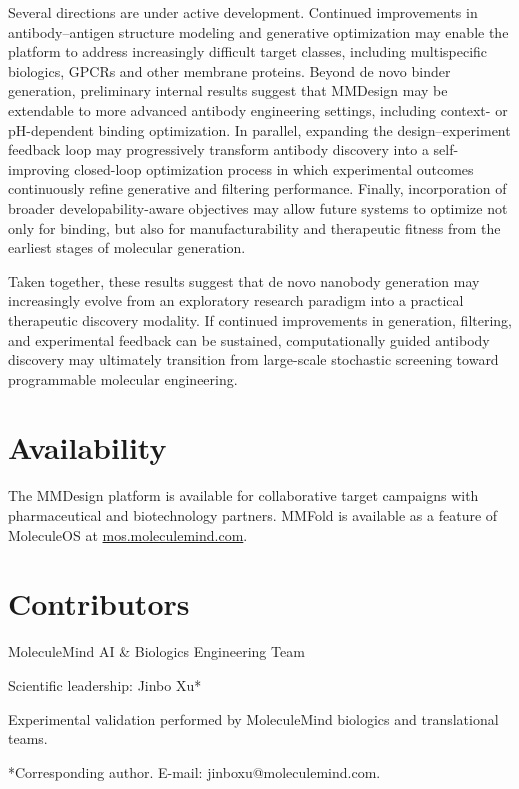 \documentclass[11pt]{article}
\begin{document}
Several directions are under active development. Continued improvements in antibody--antigen
structure modeling and generative optimization may enable the platform to address increasingly
difficult target classes, including multispecific biologics, GPCRs and other membrane proteins.
Beyond de novo binder generation, preliminary internal results suggest that MMDesign may be
extendable to more advanced antibody engineering settings, including context- or pH-dependent
binding optimization. In parallel, expanding the design--experiment feedback loop may progressively transform antibody discovery into a self-improving closed-loop optimization process in
which experimental outcomes continuously refine generative and filtering performance. Finally,
incorporation of broader developability-aware objectives may allow future systems to optimize not
only for binding, but also for manufacturability and therapeutic fitness from the earliest stages of
molecular generation.

Taken together, these results suggest that de novo nanobody generation may increasingly evolve
from an exploratory research paradigm into a practical therapeutic discovery modality. If continued
improvements in generation, filtering, and experimental feedback can be sustained, computationally
guided antibody discovery may ultimately transition from large-scale stochastic screening toward
programmable molecular engineering.

\section*{Availability}
The MMDesign platform is available for collaborative target campaigns with pharmaceutical and
biotechnology partners. MMFold is available as a feature of MoleculeOS at \url{mos.moleculemind.com}.

\section*{Contributors}
MoleculeMind AI \& Biologics Engineering Team

Scientific leadership: Jinbo Xu*

Experimental validation performed by MoleculeMind biologics and translational teams.

*Corresponding author. E-mail: jinboxu@moleculemind.com.
\end{document}
